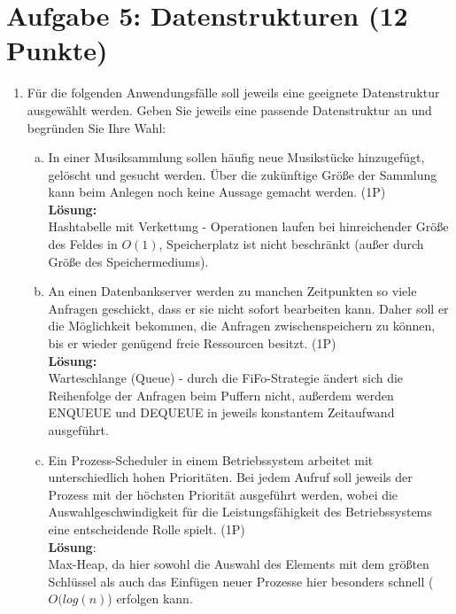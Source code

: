 \documentclass{scrartcl}
\begin{document}
\section*{Aufgabe 5: Datenstrukturen (12 Punkte)}
\begin{enumerate}[(1)]
\item Für die folgenden Anwendungsfälle soll jeweils eine geeignete Datenstruktur ausgewählt werden. Geben Sie jeweils eine passende Datenstruktur an und begründen Sie Ihre Wahl:
\begin{enumerate}[(a)]
\item In einer Musiksammlung sollen häufig neue Musikstücke hinzugefügt, gelöscht und gesucht werden. Über die zukünftige Größe der Sammlung kann beim Anlegen noch keine Aussage gemacht werden. (1P)\\
\textbf{Lösung:}\\
Hashtabelle mit Verkettung - Operationen laufen bei hinreichender Größe des Feldes in $O(1)$, Speicherplatz ist nicht beschränkt (außer durch Größe des Speichermediums).
\item An einen Datenbankserver werden zu manchen Zeitpunkten so viele Anfragen geschickt, dass er sie nicht sofort bearbeiten kann. Daher soll er die Möglichkeit bekommen, die Anfragen zwischenspeichern zu können, bis er wieder genügend freie Ressourcen besitzt. (1P)\\
\textbf{Lösung:}\\
Warteschlange (Queue) - durch die FiFo-Strategie ändert sich die Reihenfolge der Anfragen beim Puffern nicht, außerdem werden ENQUEUE und DEQUEUE in jeweils konstantem Zeitaufwand ausgeführt.
\item Ein Prozess-Scheduler in einem Betriebssystem arbeitet mit unterschiedlich hohen Prioritäten. Bei jedem Aufruf soll jeweils der Prozess mit der höchsten Priorität ausgeführt werden, wobei die Auswahlgeschwindigkeit für die Leistungsfähigkeit des Betriebssystems eine entscheidende Rolle spielt. (1P)\\
\textbf{Lösung}:\\
Max-Heap, da hier sowohl die Auswahl des Elements mit dem größten Schlüssel als auch das Einfügen neuer Prozesse hier besonders schnell ($O(log(n)$) erfolgen kann. 
\end{enumerate}


\end{enumerate}
\end{document}
